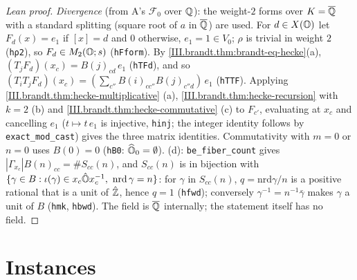 \begin{proof}[Lean proof]
\emph{Divergence} (from A's $\mathcal F_0$ over $\mathbb{Q}$): the weight-$2$ forms over $K=\overline{\mathbb{Q}}$ with a standard splitting (square root of $a$ in $\overline{\mathbb{Q}}$) are used. For $d\in X(\mathbb{O})$ let $F_d(x)=e_1$ if $[x]=d$ and $0$ otherwise, $e_1=1\in V_0$; $\rho$ is trivial in weight $2$ (\texttt{hρ2}), so $F_d\in M_2(\mathbb{O};s)$ (\texttt{hFform}). By \cref{III.brandt.thm:brandt-eq-hecke}(a), $(T_jF_d)(x_c)=B(j)_{cd}\,e_1$ (\texttt{hTFd}), and so $(T_iT_jF_d)(x_c)=(\sum_{c''}B(i)_{cc''}B(j)_{c''d})\,e_1$ (\texttt{hTTF}). Applying \cref{III.brandt.thm:hecke-multiplicative} (a), \cref{III.brandt.thm:hecke-recursion} with $k=2$ (b) and \cref{III.brandt.thm:hecke-commutative} (c) to $F_{c'}$, evaluating at $x_c$ and cancelling $e_1$ ($t\mapsto t\,e_1$ is injective, \texttt{hinj}; the integer identity follows by \texttt{exact\_mod\_cast}) gives the three matrix identities. Commutativity with $m=0$ or $n=0$ uses $B(0)=0$ (\texttt{hB0}: $\widehat{\mathbb{O}}_0=\emptyset$). (d): \texttt{be\_fiber\_count} gives $|\Gamma_{x_c}|B(n)_{cc}=\#S_{cc}(n)$, and $S_{cc}(n)$ is in bijection with $\{\gamma\in B:\iota(\gamma)\in x_c\hat{\Oord}x_c^{-1},\ \mathrm{nrd}\,\gamma=n\}$: for $\gamma$ in $S_{cc}(n)$, $q=\mathrm{nrd}\gamma/n$ is a positive rational that is a unit of $\hat{\mathbb{Z}}$, hence $q=1$ (\texttt{hfwd}); conversely $\gamma^{-1}=n^{-1}\bar\gamma$ makes $\gamma$ a unit of $B$ (\texttt{hmk}, \texttt{hbwd}). The field is $\overline{\mathbb{Q}}$ internally; the statement itself has no field.
\end{proof}

\section{Instances}\label{sec:brandt-instances}

